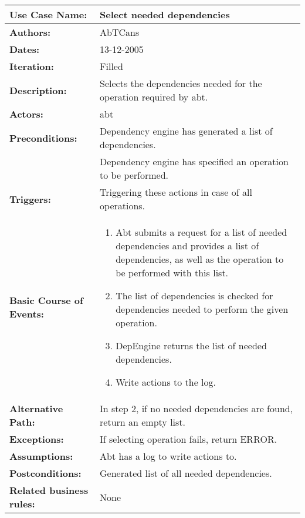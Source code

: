 \begin{tabularx}{\linewidth}{|l|X|}
\hline
\textbf{Use Case Name:} & \textbf{Select needed dependencies} \\
\hline
\textbf{Authors:} & AbTCans\\
\hline
\textbf{Dates:} & 13-12-2005\\
\hline
\textbf{Iteration:} & Filled\\
\hline
\textbf{Description:} & Selects the dependencies needed for the operation required by abt.\\
\hline
\textbf{Actors:} & abt\\ 
\hline
\textbf{Preconditions:} & Dependency engine has generated a list of dependencies.\\ 
 & Dependency engine has specified an operation to be performed.\\ 
\hline
\textbf{Triggers:} & Triggering these actions in case of all operations.\\
\hline
\textbf{Basic Course of Events:} & 
\begin{minipage}{\linewidth} 
  \vspace{0.05em}
  \begin{enumerate}
   \item Abt submits a request for a list of needed dependencies and provides a list of dependencies, as well as the operation to be performed with this list.
   \item The list of dependencies is checked for dependencies needed to perform the given operation.
   \item DepEngine returns the list of needed dependencies.
   \item Write actions to the log.
  \end{enumerate}
  \vspace{0.05em}
\end{minipage}
\\
\hline 
\textbf{Alternative Path:} & In step 2, if no needed dependencies are found, return an empty list.\\
\hline
\textbf{Exceptions:} & If selecting operation fails, return ERROR. \\
\hline
\textbf{Assumptions:} & Abt has a log to write actions to.\\
\hline
\textbf{Postconditions:} & Generated list of all needed dependencies.\\
\hline
\textbf{Related business rules:} & None\\
\hline
\end{tabularx}


    